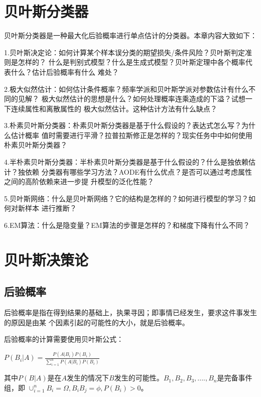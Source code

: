 \documentclass[UTF8]{ctexart}
\begin{document}
\newpage
\tableofcontents
\newpage
\Large{
\section{贝叶斯分类器}
贝叶斯分类器是一种最大化后验概率进行单点估计的分类器。本章内容大致如下：\par
1.贝叶斯决定论：如何计算某个样本误分类的期望损失/条件风险？贝叶斯判定准则是怎样的？
什么是判别式模型？什么是生成式模型？贝叶斯定理中各个概率代表什么？估计后验概率有什么
难处？\par
2.极大似然估计：如何估计条件概率？频率学派和贝叶斯学派对参数估计有什么不同的见解？
极大似然估计的思想是什么？如何处理概率连乘造成的下溢？试想一下连续属性和离散属性的
极大似然估计。这种估计方法有什么缺点？\par
3.朴素贝叶斯分类器：朴素贝叶斯分类器是基于什么假设的？表达式怎么写？为什么估计概率
值时需要进行平滑？拉普拉斯修正是怎样的？现实任务中中如何使用朴素贝叶斯分类器？\par
4.半朴素贝叶斯分类器：半朴素贝叶斯分类器是基于什么假设的？什么是独依赖估计？独依赖
分类器有哪些学习方法？AODE有什么优点？是否可以通过考虑属性之间的高阶依赖来进一步提
升模型的泛化性能？\par
5.贝叶斯网络：什么是贝叶斯网络？它的结构是怎样的？如何进行模型的学习？如何对新样本
进行推断？\par
6.EM算法：什么是隐变量？EM算法的步骤是怎样的？和梯度下降有什么不同？\newpage
\section{贝叶斯决策论}
\subsection{后验概率}
后验概率是指在得到结果的基础上，执果寻因；即事情已经发生，要求这件事发生的原因是由某
个因素引起的可能性的大小，就是后验概率。\par
后验概率的计算需要使用贝叶斯公式：
\begin{center}
    \Large{
        $P(B_i|A)=\frac{P(A|B_i)P(B_i)}{\sum_{i=1}^nP(A|B_i)P(B_i)}$\\[2ex]
    }
\end{center}
其中$P(B|A)$是在$A$发生的情况下$B$发生的可能性。$B_1,B_2,B_3,....,B_n$是完备事件组，即
$\cup_{i=1}^nB_i=\Omega,B_iB_j=\phi,P(B_i)>0$。
}
\end{document}

